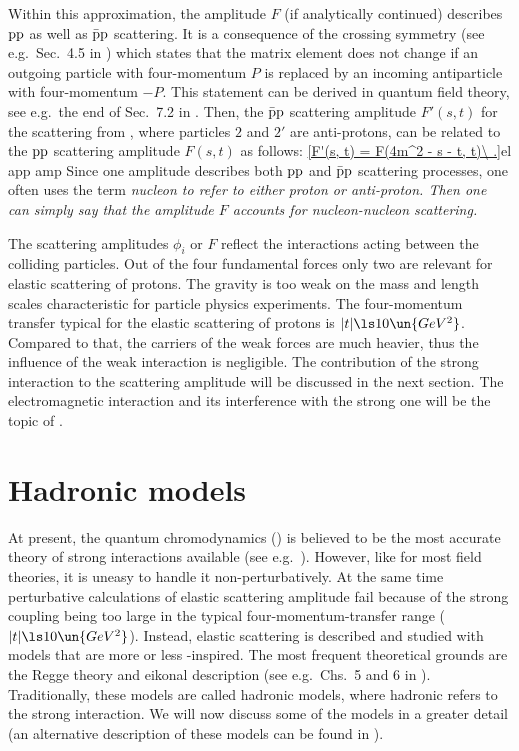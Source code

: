 Within this approximation, the amplitude $F$ (if analytically continued) describes $\rm pp$ as well as $\rm \bar pp$ scattering. It is a consequence of the crossing symmetry (see e.g.~Sec.~4.5 in ) which states that the matrix element does not change if an outgoing particle with four-momentum $P$ is replaced by an incoming antiparticle with four-momentum $-P$. This statement can be derived in quantum field theory, see e.g.~the end of Sec.~7.2 in . Then, the $\rm \bar pp$ scattering amplitude $F'(s, t)$ for the scattering from , where particles $2$ and $2'$ are anti-protons, can be related to the $\rm pp$ scattering amplitude $F(s, t)$ as follows:
\eqref{F'(s, t) = F(4m^2 - s - t, t)\ .}{el app amp}
Since one amplitude describes both $\rm pp$ and $\rm\bar pp$ scattering processes, one often uses the term \em{nucleon} to refer to either proton or anti-proton. Then one can simply say that the amplitude $F$ accounts for nucleon-nucleon scattering.

The scattering amplitudes $\phi_i$ or $F$ reflect the interactions acting between the colliding particles. Out of the four fundamental forces only two are relevant for elastic scattering of protons. The gravity is too weak on the mass and length scales characteristic for particle physics experiments. The four-momentum transfer typical for the elastic scattering of protons is $|t| \ls 10\un{GeV^2}$. Compared to that, the carriers of the weak forces are much heavier, thus the influence of the weak interaction is negligible. The contribution of the strong interaction to the scattering amplitude will be discussed in the next section. The electromagnetic interaction and its interference with the strong one will be the topic of .

\section[el models]{Hadronic models}

At present, the quantum chromodynamics () is believed to be the most accurate theory of strong interactions available (see e.g.~). However, like for most field theories, it is uneasy to handle it non-perturbatively. At the same time perturbative calculations of elastic scattering amplitude fail because of the strong coupling being too large in the typical four-momentum-transfer range ($|t| \ls 10\un{GeV^2}$). Instead, elastic scattering is described and studied with models that are more or less -inspired. The most frequent theoretical grounds are the Regge theory and eikonal description (see e.g.~Chs.~5 and 6 in ). Traditionally, these models are called hadronic models, where hadronic refers to the strong interaction. We will now discuss some of the models in a greater detail (an alternative description of these models can be found in ).

